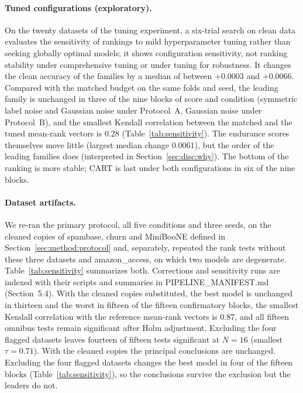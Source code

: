 \documentclass[pdflatex,sn-mathphys]{sn-jnl}
\theoremstyle{thmstyleone}
\theoremstyle{thmstyletwo}
\theoremstyle{thmstylethree}
\begin{document}
\paragraph{Tuned configurations (exploratory).} On the twenty datasets of the tuning experiment, a six-trial search on clean data evaluates the sensitivity of rankings to mild hyperparameter tuning rather than seeking globally optimal models; it shows configuration sensitivity, not ranking stability under comprehensive tuning or under tuning for robustness. It changes the clean accuracy of the families by a median of between $+0.0003$ and $+0.0066$. Compared with the matched budget on the same folds and seed, the leading family is unchanged in three of the nine blocks of score and condition (symmetric label noise and Gaussian noise under Protocol~A, Gaussian noise under Protocol~B), and the smallest Kendall correlation between the matched and the tuned mean-rank vectors is $0.28$ (Table~\ref{tab:sensitivity}). The endurance scores themselves move little (largest median change $0.0061$), but the order of the leading families does (interpreted in Section~\ref{sec:disc:why}). The bottom of the ranking is more stable; CART is last under both configurations in six of the nine blocks.

\paragraph{Dataset artifacts.} We re-ran the primary protocol, all five conditions and three seeds, on the cleaned copies of spambase, churn and MiniBooNE defined in Section~\ref{sec:method:protocol} and, separately, repeated the rank tests without these three datasets and amazon\_access, on which two models are degenerate. Table~\ref{tab:sensitivity} summarizes both. Corrections and sensitivity runs are indexed with their scripts and summaries in PIPELINE\_MANIFEST.md (Section~5.4). With the cleaned copies substituted, the best model is unchanged in thirteen and the worst in fifteen of the fifteen confirmatory blocks, the smallest Kendall correlation with the reference mean-rank vectors is $0.87$, and all fifteen omnibus tests remain significant after Holm adjustment. Excluding the four flagged datasets leaves fourteen of fifteen tests significant at $N=16$ (smallest $\tau=0.71$). With the cleaned copies the principal conclusions are unchanged. Excluding the four flagged datasets changes the best model in four of the fifteen blocks (Table~\ref{tab:sensitivity}), so the conclusions survive the exclusion but the leaders do not.
\end{document}
